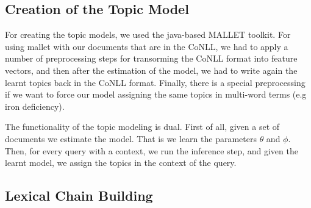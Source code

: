 \documentclass[11pt, a4paper, abstraction]{scrartcl}
\begin{document}
\subsection{Creation of the Topic Model}

For creating the topic models, we used the java-based MALLET toolkit. For using mallet with our documents that are in the CoNLL, we had to apply a number of preprocessing steps for transorming the CoNLL format into feature vectors, and then after the estimation of the model, we had to write again the learnt topics back in the CoNLL format. Finally, there is a special preprocessing if we want to force our model assigning the same topics in multi-word terms (e.g iron deficiency).

The functionality of the topic modeling is dual. First of all, given a set of documents we estimate the model. That is we  learn the parameters $\theta$ and $\phi$. Then, for every query with a context, we run the inference step, and given the learnt model, we assign the topics in the context of the query. 

\subsection{Lexical Chain Building}
\end{document}
